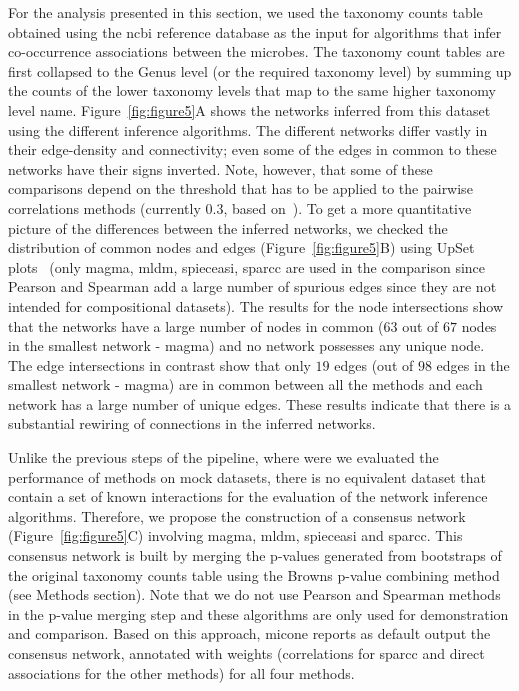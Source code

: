   For the analysis presented in this section, we used the taxonomy counts table obtained using the \ac{ncbi} reference database as the input for algorithms that infer co-occurrence associations between the microbes.
  The taxonomy count tables are first collapsed to the Genus level (or the required taxonomy level) by summing up the counts of the lower taxonomy levels that map to the same higher taxonomy level name.
  Figure~\ref{fig:figure5}A shows the networks inferred from this dataset using the different inference algorithms.
  The different networks differ vastly in their edge-density and connectivity; even some of the edges in common to these networks have their signs inverted. Note, however, that some of these comparisons depend on the threshold that has to be applied to the pairwise correlations methods (currently 0.3, based on~\cite{Friedman2012}).
  To get a more quantitative picture of the differences between the inferred networks, we checked the distribution of common nodes and edges (Figure~\ref{fig:figure5}B) using UpSet plots~\cite{Lex} (only \ac{magma}, \ac{mldm}, \ac{spieceasi}, \ac{sparcc} are used in the comparison since Pearson and Spearman add a large number of spurious edges since they are not intended for compositional datasets).
  The results for the node intersections show that the networks have a large number of nodes in common ($63$ out of $67$ nodes in the smallest network - \ac{magma}) and no network possesses any unique node.
  The edge intersections in contrast show that only $19$ edges (out of $98$ edges in the smallest network - \ac{magma}) are in common between all the methods and each network has a large number of unique edges.
  These results indicate that there is a substantial rewiring of connections in the inferred networks.

  Unlike the previous steps of the pipeline, where were we evaluated the performance of methods on mock datasets, there is no equivalent dataset that contain a set of known interactions for the evaluation of the network inference algorithms.
  Therefore, we propose the construction of a consensus network (Figure~\ref{fig:figure5}C) involving \ac{magma}, \ac{mldm}, \ac{spieceasi} and \ac{sparcc}. This consensus network is built by merging the p-values generated from bootstraps of the original taxonomy counts table using the Browns p-value combining method~\cite{brown_400_1975} (see Methods section).
  Note that we do not use Pearson and Spearman methods in the p-value merging step and these algorithms are only used for demonstration and comparison.
  Based on this approach, \ac{micone} reports as default output the consensus network, annotated with weights (correlations for \ac{sparcc} and direct associations for the other methods) for all four methods.

